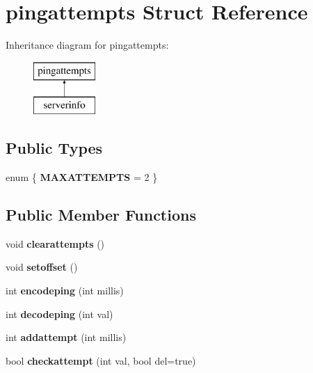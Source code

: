 \hypertarget{structpingattempts}{}\section{pingattempts Struct Reference}
\label{structpingattempts}
Inheritance diagram for pingattempts\+:\begin{figure}[H]
\begin{center}
\leavevmode
\includegraphics[height=2.000000cm]{structpingattempts}
\end{center}
\end{figure}
\subsection*{Public Types}
\begin{DoxyCompactItemize}
\item 
\mbox{\label{structpingattempts_a06e220fdd8468912bc3c45ad4a2e5695}} 
enum \{ {\bfseries M\+A\+X\+A\+T\+T\+E\+M\+P\+TS} = 2
 \}
\end{DoxyCompactItemize}
\subsection*{Public Member Functions}
\begin{DoxyCompactItemize}
\item 
\mbox{\label{structpingattempts_a26fa483375586063ffc24029ff87b1a5}} 
void {\bfseries clearattempts} ()
\item 
\mbox{\label{structpingattempts_a730cd15c25dc55c6d5ebb0f49a39bac9}} 
void {\bfseries setoffset} ()
\item 
\mbox{\label{structpingattempts_a47b62e50f342292375f5bdfc84295463}} 
int {\bfseries encodeping} (int millis)
\item 
\mbox{\label{structpingattempts_a8fe0db25f8394e060e30c1b7f4d92573}} 
int {\bfseries decodeping} (int val)
\item 
\mbox{\label{structpingattempts_a2e7589ac140d1feca7fb628e87e2b304}} 
int {\bfseries addattempt} (int millis)
\item 
\mbox{\label{structpingattempts_a8a5c053df3fad1ed8faaf6ad09e271c2}} 
bool {\bfseries checkattempt} (int val, bool del=true)
\end{DoxyCompactItemize}
